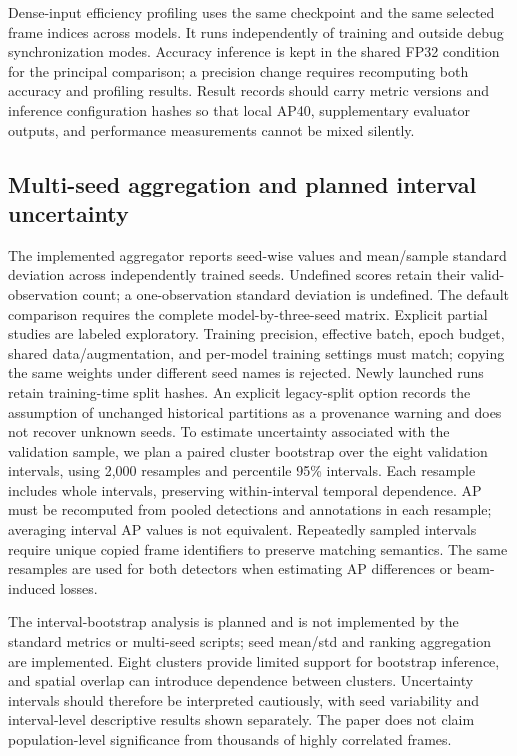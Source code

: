 \documentclass[10pt,twocolumn]{article}
\begin{document}
Dense-input efficiency profiling uses the same checkpoint and the same selected frame indices across models. It runs independently of training and outside debug synchronization modes. Accuracy inference is kept in the shared FP32 condition for the principal comparison; a precision change requires recomputing both accuracy and profiling results. Result records should carry metric versions and inference configuration hashes so that local AP40, supplementary evaluator outputs, and performance measurements cannot be mixed silently.

\subsection{Multi-seed aggregation and planned interval uncertainty}
The implemented aggregator reports seed-wise values and mean/sample standard deviation across independently trained seeds. Undefined scores retain their valid-observation count; a one-observation standard deviation is undefined. The default comparison requires the complete model-by-three-seed matrix. Explicit partial studies are labeled exploratory. Training precision, effective batch, epoch budget, shared data/augmentation, and per-model training settings must match; copying the same weights under different seed names is rejected. Newly launched runs retain training-time split hashes. An explicit legacy-split option records the assumption of unchanged historical partitions as a provenance warning and does not recover unknown seeds. To estimate uncertainty associated with the validation sample, we plan a paired cluster bootstrap over the eight validation intervals, using 2,000 resamples and percentile 95\% intervals. Each resample includes whole intervals, preserving within-interval temporal dependence. AP must be recomputed from pooled detections and annotations in each resample; averaging interval AP values is not equivalent. Repeatedly sampled intervals require unique copied frame identifiers to preserve matching semantics. The same resamples are used for both detectors when estimating AP differences or beam-induced losses.

The interval-bootstrap analysis is planned and is not implemented by the standard metrics or multi-seed scripts; seed mean/std and ranking aggregation are implemented. Eight clusters provide limited support for bootstrap inference, and spatial overlap can introduce dependence between clusters. Uncertainty intervals should therefore be interpreted cautiously, with seed variability and interval-level descriptive results shown separately. The paper does not claim population-level significance from thousands of highly correlated frames.
\end{document}
